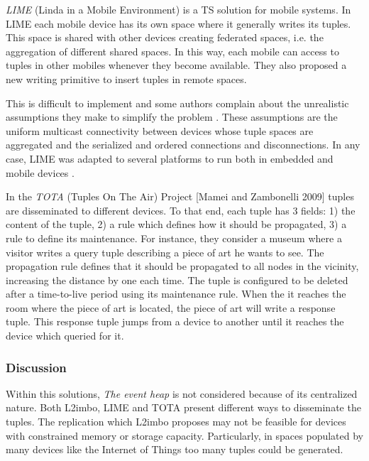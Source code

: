 \emph{LIME} (Linda in a Mobile Environment) \cite{picco_lime:_1999} is a TS solution for mobile systems.
In LIME each mobile device has its own space where it generally writes its tuples.
This space is shared with other devices creating federated spaces, i.e. the aggregation of different shared spaces.
In this way, each mobile can access to tuples in other mobiles whenever they become available.
They also proposed a new writing primitive to insert tuples in remote spaces.

This is difficult to implement and some authors complain about the unrealistic assumptions they make to simplify the problem \cite{coulouris_distributed_2012}. %
These assumptions are the uniform multicast connectivity between devices whose tuple spaces are aggregated and the serialized and ordered connections and disconnections.
In any case, LIME was adapted to several platforms to run both in embedded and mobile devices \cite{murphy_transiently_2006}.


In the \emph{TOTA} (Tuples On The Air) Project [Mamei and Zambonelli 2009] tuples are disseminated to different devices. %
To that end, each tuple has 3 fields:
1) the content of the tuple,
2) a rule which defines how it should be propagated,
3) a rule to define its maintenance.
For instance, they consider a museum where a visitor writes a query tuple describing a piece of art he wants to see.
The propagation rule defines that it should be propagated to all nodes in the vicinity, increasing the distance by one each time.
The tuple is configured to be deleted after a time-to-live period using its maintenance rule.
When the it reaches the room where the piece of art is located, the piece of art will write a response tuple.
This response tuple jumps from a device to another until it reaches the device which queried for it.



\subsubsection{Discussion}


Within this solutions, \emph{The event heap} is not considered because of its centralized nature.
Both L2imbo, LIME and TOTA present different ways to disseminate the tuples.
The replication which L2imbo proposes may not be feasible for devices with constrained memory or storage capacity.
Particularly, in spaces populated by many devices like the Internet of Things too many tuples could be generated.

